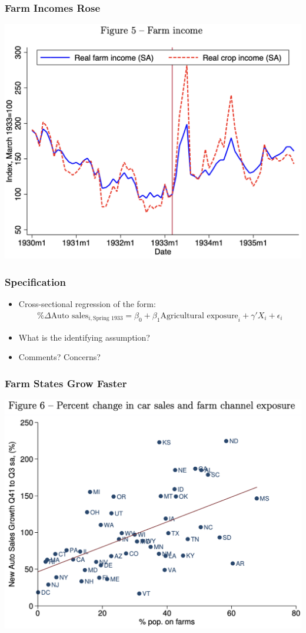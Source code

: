 \documentclass[english,xcolor=svgnames]{beamer}
\begin{document}
\begin{frame}
\frametitle[alignment=center]{Farm Incomes Rose}
\centering
\includegraphics[scale=0.5]{figures/HRWFIG5.png}
\end{frame}


\begin{frame}
\frametitle[alignment=center]{Specification}
\begin{itemize}
	\item Cross-sectional regression of the form:
	\begin{align*}
		\%\Delta \text{Auto sales}_{i,\text{Spring 1933}} = \beta_0 + \beta_1 \text{Agricultural exposure}_i + \gamma'X_i+\epsilon_i
	\end{align*}
	\item What is the identifying assumption?
	\item Comments? Concerns?
\end{itemize}
\end{frame}

\begin{frame}
\frametitle[alignment=center]{Farm States Grow Faster}
\centering
\includegraphics[scale=0.5]{figures/HRWFIG6a.png}
\end{frame}
\end{document}
